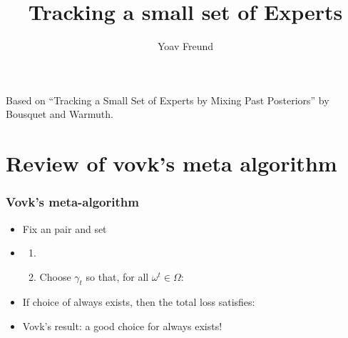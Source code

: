 \documentclass{beamer}
\title %
{Tracking a small set of Experts}
\author[Freund] %
{Yoav Freund}
\institute[Universities of Somewhere and Elsewhere] %
\begin{document}
%


\begin{frame}
  \titlepage
  Based on ``Tracking a Small Set of Experts by Mixing Past
  Posteriors'' by Bousquet and Warmuth.
\end{frame}

\section{Review of vovk's meta algorithm}
\begingroup
\small

\begin{frame}
\frametitle{Vovk's meta-algorithm}
\begin{itemize}
\item Fix an  pair  and set 
\item \begin{enumerate}
\item
{}
\item
Choose $\gamma_t$ so that, for all $\omega^t \in \Omega$:
\end{enumerate}
\item
If choice of  always exists, then the total loss satisfies:
\item
Vovk's result:  a good choice for  always exists!
\end{itemize}
\end{frame}
\end{document}
